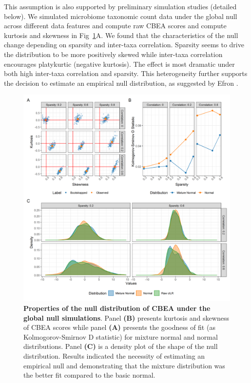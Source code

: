 \documentclass[10pt,letterpaper]{article}
\begin{document}
This assumption is also supported by preliminary simulation studies (detailed below). We simulated microbiome taxonomic count data under the global null across different data features and compute raw CBEA scores and compute kurtosis and skewness in Fig~\ref{fig:1}A. We found that the characteristics of the null change depending on sparsity and inter-taxa correlation. Sparsity seems to drive the distribution to be more positively skewed while inter-taxa correlation encourages platykurtic (negative kurtosis). The effect is most dramatic under both high inter-taxa correlation and sparsity. This heterogeneity further supports the decision to estimate an empirical null distribution, as suggested by Efron \cite{efron2004}. 

\begin{figure} [!h]
    \centering
    \includegraphics[width=\linewidth]{figures/kurtosis_skewness_gof.png}
    \caption{{\bf Properties of the null distribution of CBEA under the global null simulations}. Panel \textbf{(B)} presents kurtosis and skewness of CBEA scores while panel \textbf{(A)} presents the goodness of fit (as Kolmogorov-Smirnov D statistic) for mixture normal and normal distributions. Panel \textbf{(C)} is a density plot of the shape of the null distribution. Results indicated the necessity of estimating an empirical null and demonstrating that the mixture distribution was the better fit compared to the basic normal.}
    \label{fig:1}
\end{figure}
\end{document}
